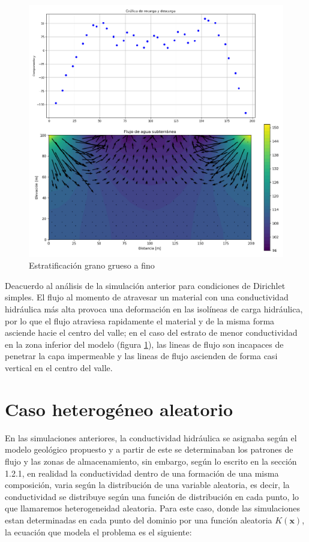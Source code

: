 \newpage 
 
\begin{figure}[H]
\centering
\includegraphics[scale=0.50]{Figura_36d.png}
\caption{ Estratificación grano grueso a fino}
\label{Figura3:8}
\end{figure}


Deacuerdo al análisis de la simulación anterior para condiciones de Dirichlet simples. El flujo al momento de atravesar un material con una conductividad hidráulica más alta provoca una deformación en las isolíneas de carga hidráulica, por lo que el flujo atraviesa rapidamente el material y de la misma forma asciende hacie el centro del valle; en el caso del estrato de menor conductividad en la zona inferior del modelo (figura \ref{Figura3:8}), las lineas de flujo son incapaces de penetrar la capa impermeable y las lineas de flujo ascienden de forma casi vertical en el centro del valle.

\section{Caso heterogéneo aleatorio}

En las simulaciones anteriores, la conductividad hidráulica se asignaba según el modelo geológico propuesto y a partir de este se determinaban los patrones de flujo y las zonas de almacenamiento, sin embargo, según lo escrito en la sección 1.2.1,  en realidad la conductividad dentro de una formación de una misma composición, varia según la distribución de una variable aleatoria, es decir, la conductividad se distribuye según una función de distribución en cada punto, lo que llamaremos heterogeneidad aleatoria. Para este caso, donde las simulaciones estan determinadas en cada punto del dominio por una función aleatoria $K(\textbf{x})$, la ecuación que modela el problema es el siguiente:

